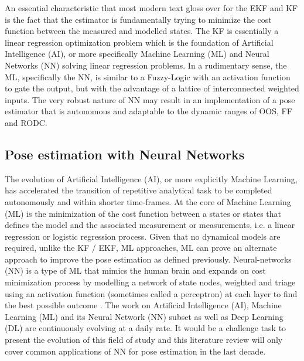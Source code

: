 
An essential characteristic that most modern text gloss over for the EKF and KF is the fact that the estimator is fundamentally trying to minimize the cost function between the measured and modelled states. The KF is essentially a linear regression optimization problem which is the foundation of Artificial Intelligence (AI), or more specifically Machine Learning (ML) and Neural Networks (NN) solving linear regression problems. In a rudimentary sense, the ML, specifically the NN, is similar to a Fuzzy-Logic with an activation function to gate the output, but with the advantage of a lattice of interconnected weighted inputs. The very robust nature of NN may result in an implementation of a pose estimator that is autonomous and adaptable to the dynamic ranges of OOS, FF and RODC. 

\subsection{Pose estimation with Neural Networks}\label{CHAP1_3_2}
The evolution of Artificial Intelligence (AI), or more explicitly Machine Learning, has accelerated the transition of repetitive analytical task to be completed autonomously and within shorter time-frames. At the core of Machine Learning (ML) is the minimization of the cost function between a states or states that defines the model and the associated measurement or measurements, i.e. a linear regression or logistic regression process. Given that no dynamical models are required, unlike the KF / EKF, ML approaches, ML can prove an alternate approach to improve the pose estimation as defined previously. Neural-networks (NN) is a type of ML that mimics the human brain and expands on cost minimization process by modelling a network of state nodes, weighted and triage using an activation function (sometimes called a perceptron) at each layer to find the best possible outcome \cite{yangML21}. The work on Artificial Intelligence (AI), Machine Learning (ML) and its Neural Network (NN) subset as well as Deep Learning (DL) are continuously evolving at a daily rate. It would be a challenge task to present the evolution of this field of study and this literature review will only cover common applications of NN for pose estimation in the last decade.

